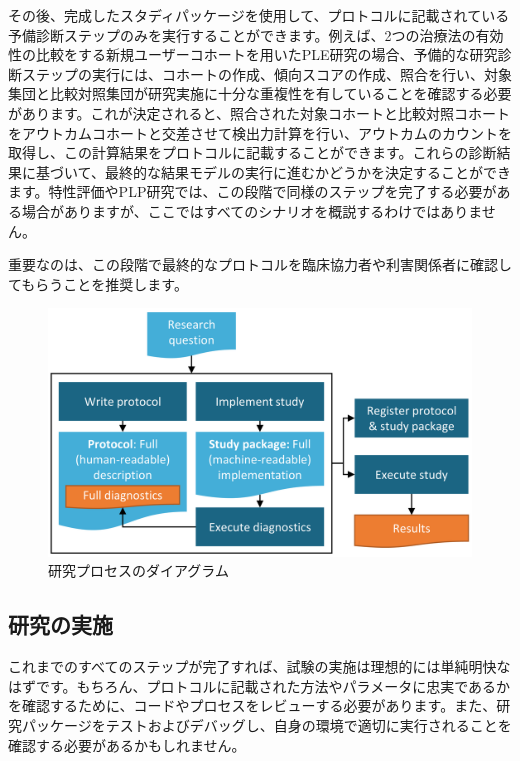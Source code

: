 \documentclass[
  11pt]{book}
\theoremstyle{definition}
\theoremstyle{definition}
\theoremstyle{definition}
\theoremstyle{definition}
\theoremstyle{remark}
\begin{document}
その後、完成したスタディパッケージを使用して、プロトコルに記載されている予備診断ステップのみを実行することができます。例えば、2つの治療法の有効性の比較をする新規ユーザーコホートを用いたPLE研究の場合、予備的な研究診断ステップの実行には、コホートの作成、傾向スコアの作成、照合を行い、対象集団と比較対照集団が研究実施に十分な重複性を有していることを確認する必要があります。これが決定されると、照合された対象コホートと比較対照コホートをアウトカムコホートと交差させて検出力計算を行い、アウトカムのカウントを取得し、この計算結果をプロトコルに記載することができます。これらの診断結果に基づいて、最終的な結果モデルの実行に進むかどうかを決定することができます。特性評価やPLP研究では、この段階で同様のステップを完了する必要がある場合がありますが、ここではすべてのシナリオを概説するわけではありません。

重要なのは、この段階で最終的なプロトコルを臨床協力者や利害関係者に確認してもらうことを推奨します。

\begin{figure}

{\centering \includegraphics[width=0.9\linewidth]{images/StudySteps/studyProcess} 

}

\caption{研究プロセスのダイアグラム}\label{fig:studyProcess}
\end{figure}

\subsection{研究の実施}\label{ux7814ux7a76ux306eux5b9fux65bd}

これまでのすべてのステップが完了すれば、試験の実施は理想的には単純明快なはずです。もちろん、プロトコルに記載された方法やパラメータに忠実であるかを確認するために、コードやプロセスをレビューする必要があります。また、研究パッケージをテストおよびデバッグし、自身の環境で適切に実行されることを確認する必要があるかもしれません。
\end{document}
